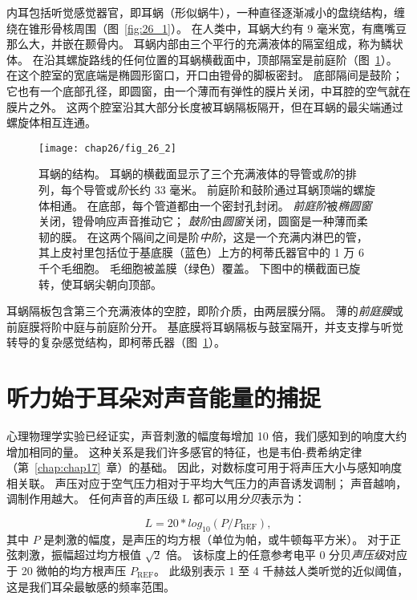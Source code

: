 内耳包括听觉感觉器官，即耳蜗（形似蜗牛），一种直径逐渐减小的盘绕结构，缠绕在锥形骨核周围（图~\ref{fig:26_1}）。
在人类中，耳蜗大约有 9 毫米宽，有鹰嘴豆那么大，并嵌在颞骨内。
耳蜗内部由三个平行的充满液体的隔室组成，称为鳞状体。
在沿其螺旋路线的任何位置的耳蜗横截面中，顶部隔室是前庭阶（图~\ref{fig:26_2}）。
在这个腔室的宽底端是椭圆形窗口，开口由镫骨的脚板密封。
底部隔间是鼓阶；
它也有一个底部孔径，即圆窗，由一个薄而有弹性的膜片关闭，中耳腔的空气就在膜片之外。
这两个腔室沿其大部分长度被耳蜗隔板隔开，但在耳蜗的最尖端通过螺旋体相互连通。


\begin{figure}[htbp]
	\centering
	\texttt{[image: chap26/fig\_26\_2]}
	\caption{耳蜗的结构。
		耳蜗的横截面显示了三个充满液体的导管或\textit{阶}的排列，每个导管或\textit{阶}长约 33 毫米。
		前庭阶和鼓阶通过耳蜗顶端的螺旋体相通。
		在底部，每个管道都由一个密封孔封闭。
		\textit{前庭阶}被\textit{椭圆窗}关闭，镫骨响应声音推动它；
		\textit{鼓阶}由\textit{圆窗}关闭，圆窗是一种薄而柔韧的膜。
		在这两个隔间之间是阶\textit{中阶}，这是一个充满内淋巴的管，其上皮衬里包括位于基底膜（蓝色）上方的柯蒂氏器官中的 1 万 6 千个毛细胞。
		毛细胞被盖膜（绿色）覆盖。
		下图中的横截面已旋转，使耳蜗尖朝向顶部。}
	\label{fig:26_2}
\end{figure}


耳蜗隔板包含第三个充满液体的空腔，即阶介质，由两层膜分隔。
薄的\textit{前庭膜}或前庭膜将阶中庭与前庭阶分开。
基底膜将耳蜗隔板与鼓室隔开，并支支撑与听觉转导的复杂感觉结构，即柯蒂氏器（图~\ref{fig:26_2}）。



\section{听力始于耳朵对声音能量的捕捉}

心理物理学实验已经证实，声音刺激的幅度每增加 10 倍，我们感知到的响度大约增加相同的量。
这种关系是我们许多感官的特征，也是韦伯-费希纳定律（第~\ref{chap:chap17}~章）的基础。
因此，对数标度可用于将声压大小与感知响度相关联。 
声压对应于空气压力相对于平均大气压力的声音诱发调制；
声音越响，调制作用越大。
任何声音的声压级 L 都可以用\textit{分贝}表示为：

\begin{equation}\label{sound_pressure}
	L = 20 * log_{10} (P/P_{\text{REF}}),
\end{equation}
%
其中 $P$ 是刺激的幅度，是声压的均方根（单位为帕，或牛顿每平方米）。 
对于正弦刺激，振幅超过均方根值 $ \sqrt{2}$ 倍。
该标度上的任意参考电平 0 分贝\textit{声压级}对应于 20 微帕的均方根声压 $P_{\text{REF}}$。
此级别表示 1 至 4 千赫兹人类听觉的近似阈值，这是我们耳朵最敏感的频率范围。


